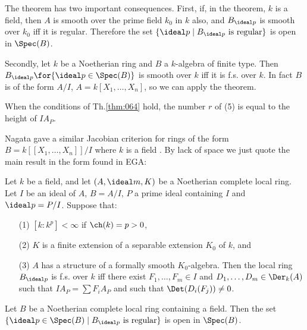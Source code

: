 \documentclass[../main]{subfiles}
\begin{document}
\begin{remark}
The theorem has two important consequences. First, if, in the theorem, $k$ is a field, then $A$ is smooth over the prime field $k_0$ in $k$ also, and $B_{\ideal p}$ is smooth over $k_0$ iff it is regular. Therefore the set $\{\ideal p \mid B_{\ideal p} \text { is regular}\}$ is open in $\Spec(B)$.

Secondly, let $k$ be a Noetherian ring and $B$ a $k$-algebra of finite type. Then $B_{\ideal p}\for{\ideal p \in \Spec(B)}$ is smooth over $k$ iff it is f.s. over $k$. In fact $B$ is of the form $A/I$, $A = k[X_1, \ldots, X_n]$, so we can apply the theorem.
\end{remark}

\begin{remark}
When the conditions of Th.\ref{thm:064} hold, the number $r$ of (5) is equal to the height of $I A_P$.
\end{remark}

\newparagraph Nagata gave a similar Jacobian criterion for rings of the form $B = k[[X_1, \ldots, X_n]]/I$ where $k$ is a field . By lack of space we just quote the main result in the form found in EGA:

\begin{theorem*}
Let $k$ be a field, and let $(A, \ideal m, K)$ be a Noetherian complete local ring. Let $I$ be an ideal of $A$, $B = A/I$, $P$ a prime ideal containing $I$ and $\ideal p = P/I$. Suppose that: 

\begin{enumerate}
    \item[(1)] $[k : k^p] < \infty$ if $\ch(k) = p > 0$,
    \item[(2)] $K$ is a finite extension of a separable extension $K_0$ of $k$, and
    \item[(3)] $A$ has a structure of a formally smooth $K_0$-algebra. Then the local ring $B_{\ideal p}$ is f.s. over $k$ iff there exist $F_1, \ldots, F_m \in I$ and $D_1, \ldots, D_m \in \Der_k(A)$ such that $I A_P = \sum F_i A_P$ and such that $\Det(D_i(F_j)) \ne 0$.
\end{enumerate}
\end{theorem*}

\begin{corollary}\label{cor:29.02}
Let $B$ be a Noetherian complete local ring containing a field. Then the set $\{\ideal p \in \Spec(B) \mid B_{\ideal p} \text { is regular}\}$ is open in $\Spec(B)$. 
\end{corollary}
\end{document}
